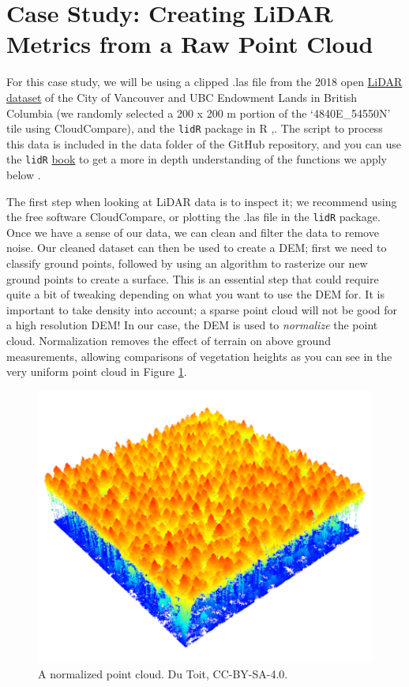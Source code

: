 \documentclass[
]{book}
\begin{document}
\section{Case Study: Creating LiDAR Metrics from a Raw Point Cloud}\label{case-study-creating-lidar-metrics-from-a-raw-point-cloud}

For this case study, we will be using a clipped .las file from the 2018 open \href{https://opendata.vancouver.ca/explore/dataset/lidar-2018/information/}{LiDAR dataset} of the City of Vancouver and UBC Endowment Lands in British Columbia (we randomly selected a 200 x 200 m portion of the `4840E\_54550N' tile using CloudCompare), and the \texttt{lidR} package in R \citep{city_of_vancouver_lidar_nodate},\citep{roussel_lidr_2020}. The script to process this data is included in the data folder of the GitHub repository, and you can use the \texttt{lidR} \href{https://r-lidar.github.io/lidRbook/}{book} to get a more in depth understanding of the functions we apply below \citep{roussel_lidr_2021}.

The first step when looking at LiDAR data is to inspect it; we recommend using the free software CloudCompare, or plotting the .las file in the \texttt{lidR} package. Once we have a sense of our data, we can clean and filter the data to remove noise. Our cleaned dataset can then be used to create a DEM; first we need to classify ground points, followed by using an algorithm to rasterize our new ground points to create a surface. This is an essential step that could require quite a bit of tweaking depending on what you want to use the DEM for. It is important to take density into account; a sparse point cloud will not be good for a high resolution DEM! In our case, the DEM is used to \emph{normalize} the point cloud. Normalization removes the effect of terrain on above ground measurements, allowing comparisons of vegetation heights as you can see in the very uniform point cloud in Figure \ref{fig:15-las-normalize}.

\begin{figure}
\includegraphics[width=0.6\linewidth]{images/15-las-normalize} \caption{A normalized point cloud. Du Toit, CC-BY-SA-4.0.}\label{fig:15-las-normalize}
\end{figure}
\end{document}

